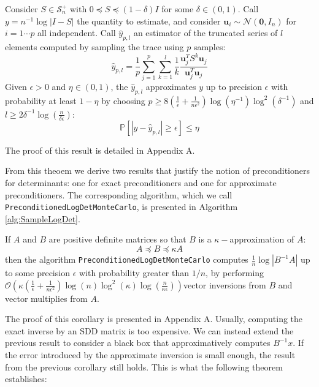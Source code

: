 \begin{theorem} \label{thm:det-sampling-theorem}Consider $S\in\mathcal{S}_{n}^{+}$
with $0\preceq S\preceq\left(1-\delta\right)I$ for some $\delta\in\left(0,1\right)$.
Call $y=n^{-1}\log\left|I-S\right|$ the quantity to estimate, and
consider $\mathbf{u}_{i}\sim\mathcal{N}\left(\mathbf{0},I_{n}\right)$
for $i=1\cdots p$ all independent. Call $\hat{y}_{p,l}$ an estimator
of the truncated series of $l$ elements computed by sampling the
trace using $p$ samples: 
\[
\hat{y}_{p,l}=\frac{1}{p}\sum_{j=1}^{p}\sum_{k=1}^{l}\frac{1}{k}\frac{\mathbf{u}_{j}^{T}S^{k}\mathbf{u}_{j}}{\mathbf{u}_{j}^{T}\mathbf{u}_{j}}
\]
Given $\epsilon>0$ and $\eta\in\left(0,1\right)$, the $\hat{y}_{p,l}$
approximates $y$ up to precision $\epsilon$ with probability at
least $1-\eta$ by choosing $p\geq8\left(\frac{1}{\epsilon}+\frac{1}{n\epsilon^{2}}\right)\log\left(\eta^{-1}\right)\log^{2}\left(\delta^{-1}\right)$
and $l\geq2\delta^{-1}\log\left(\frac{n}{\delta\epsilon}\right)$:
\[
\mathbb{P}\left[\left|y-\hat{y}_{p,l}\right|\geq\epsilon\right]\leq\eta
\]
\end{theorem}

The proof of this result is detailed in Appendix A.

From this theoem we derive two results that justify the notion of
preconditioners for determinants: one for exact preconditioners and
one for approximate preconditioners. The corresponding algorithm,
which we call \texttt{PreconditionedLogDetMonteCarlo}, is presented
in Algorithm \ref{alg:SampleLogDet}.

\begin{corollary} \label{cor:preconditioning}If $A$ and $B$ are
positive definite matrices so that $B$ is a $\kappa-$approximation
of $A$: 
\begin{equation}
A\preceq B\preceq\kappa A\label{eq:A-B-bounds}
\end{equation}
then the algorithm \texttt{PreconditionedLogDetMonteCarlo} computes
$\frac{1}{n}\log\left|B^{-1}A\right|$ up to some precision $\epsilon$
with probability greater than $1/n$, by performing $\mathcal{O}\left(\kappa\left(\frac{1}{\epsilon}+\frac{1}{n\epsilon^{2}}\right)\log\left(n\right)\log^{2}\left(\kappa\right)\log\left(\frac{n}{\kappa\epsilon}\right)\right)$vector
inversions from $B$ and vector multiplies from $A$.

\end{corollary}

The proof of this corollary is presented in Appendix A. Usually, computing
the exact inverse by an SDD matrix is too expensive. We can instead
extend the previous result to consider a black box that approximatively
computes $B^{-1}x$. If the error introduced by the approximate inversion
is small enough, the result from the previous corollary still holds.
This is what the following theorem establishes:

